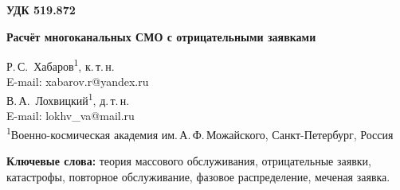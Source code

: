 \documentclass[a4paper,12pt]{article}
\begin{document}
\noindent\textbf{УДК 519.872}
\vspace{1em}

\begin{center}
{\Large\bfseries Расчёт многоканальных СМО с отрицательными заявками}
\end{center}
\vspace{0.8em}

\begin{center}
Р.\,С.~Хабаров\textsuperscript{1}, к.\,т.\,н.\\[2pt]
E-mail: xabarov.r@yandex.ru\\[6pt]
В.\,А.~Лохвицкий\textsuperscript{1}, д.\,т.\,н.\\[2pt]
E-mail: lokhv\_va@mail.ru\\[8pt]
{\small\textsuperscript{1}Военно-космическая академия им.\,А.\,Ф.\,Можайского, Санкт-Петербург, Россия}
\end{center}
\vspace{0.5em}

\begin{abstract}
Рассматриваются многоканальные системы массового обслуживания с пуассоновскими поступлениями и отрицательными воздействиями. Воздействие выбирает один занятый канал либо одновременно затрагивает всю систему. Исследуются удаление заявок и повторное обслуживание с новой или с первоначально выбранной длительностью. Для фазового обслуживания описано совместное состояние каналов и построены уравнения моментов ожидания и пребывания меченой заявки. Время пребывания при выборочных воздействиях рассчитывается с учётом изменения числа занятых каналов. Для сохранённой работы используется конечная аппроксимация процесса с непрерывными координатами; зависимость каналов при общих прерываниях сохраняется. Отдельно проверяются фазовая аппроксимация, усечение пространства состояний, экстраполяция и статистическая неопределённость имитации. Приведены результаты для нескольких нагрузок, интенсивностей воздействий и числа каналов.
\end{abstract}
\textbf{Ключевые слова:} теория массового обслуживания, отрицательные заявки, катастрофы, повторное обслуживание, фазовое распределение, меченая заявка.
\end{document}

